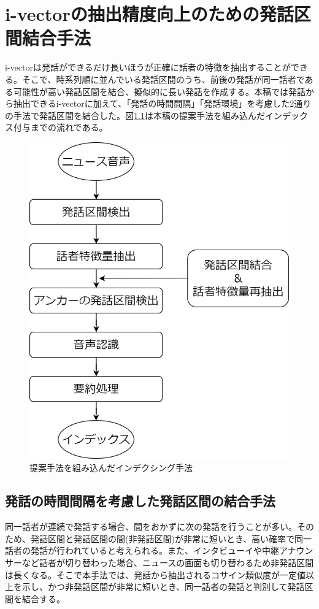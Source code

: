 \chapter{i-vectorの抽出精度向上のための発話区間結合手法}
\label{chapter:prob_method}
i-vectorは発話ができるだけ長いほうが正確に話者の特徴を抽出することができる。そこで、時系列順に並んでいる発話区間のうち、前後の発話が同一話者である可能性が高い発話区間を結合、擬似的に長い発話を作成する。本稿では発話から抽出できるi-vectorに加えて、「発話の時間間隔」「発話環境」を考慮した2通りの手法で発話区間を結合した。図\ref{fig:indexing2}は本稿の提案手法を組み込んだインデックス付与までの流れである。

\begin{figure}[H]
  \begin{center}
    \includegraphics[scale=0.3]{./figure/indexing2.eps}
  \end{center}
  \caption{提案手法を組み込んだインデクシング手法 \label{fig:indexing2}}
\end{figure}

\section{発話の時間間隔を考慮した発話区間の結合手法}
\label{prob1}
同一話者が連続で発話する場合、間をおかずに次の発話を行うことが多い。そのため、発話区間と発話区間の間(非発話区間)が非常に短いとき、高い確率で同一話者の発話が行われていると考えられる。また、インタビューイや中継アナウンサーなど話者が切り替わった場合、ニュースの画面も切り替わるため非発話区間は長くなる。そこで本手法では、発話から抽出されるコサイン類似度が一定値以上を示し、かつ非発話区間が非常に短いとき、同一話者の発話と判別して発話区間を結合する。

